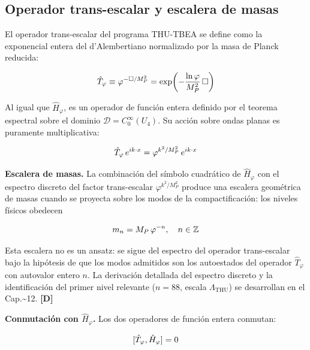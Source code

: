﻿\documentclass[11pt,letterpaper]{article}
\begin{document}
\subsection{Operador trans-escalar y escalera de masas}
El operador trans-escalar del programa THU-TBEA se define como la exponencial entera del d'Alembertiano normalizado por la masa de Planck reducida:

\begin{equation*}
  \resizebox{\ifdim\width>\linewidth \linewidth\else\width\fi}{!}{$\displaystyle \hat{T}_\varphi \equiv \varphi^{-\Box/M_P^2} = \exp\!\left(-\frac{\ln\varphi}{M_P^2}\,\Box\right)$}
\end{equation*}

Al igual que $\hat{H}_\varphi$, es un operador de función entera definido por el teorema espectral sobre el dominio $\mathcal{D} = C_0^\infty(U_4)$. Su acción sobre ondas planas es puramente multiplicativa:

\begin{equation*}
  \resizebox{\ifdim\width>\linewidth \linewidth\else\width\fi}{!}{$\displaystyle \hat{T}_\varphi\, e^{ik\cdot x} = \varphi^{k^2/M_P^2}\, e^{ik\cdot x}$}
\end{equation*}

\textbf{Escalera de masas.} La combinación del símbolo cuadrático de $\hat{H}_\varphi$ con el espectro discreto del factor trans-escalar $\varphi^{k^2/M_P^2}$ produce una escalera geométrica de masas cuando se proyecta sobre los modos de la compactificación: los niveles físicos obedecen

\begin{equation*}
  \resizebox{\ifdim\width>\linewidth \linewidth\else\width\fi}{!}{$\displaystyle m_n = M_P\,\varphi^{-n}, \quad n \in \mathbb{Z}$}
\end{equation*}

Esta escalera no es un ansatz: se sigue del espectro del operador trans-escalar bajo la hipótesis de que los modos admitidos son los autoestados del operador $\hat{T}_\varphi$ con autovalor entero $n$. La derivación detallada del espectro discreto y la identificación del primer nivel relevante ($n = 88$, escala $\Lambda_{\mathrm{THU}}$) se desarrollan en el Cap.\textasciitilde{}12. \textbf{[D]}

\textbf{Conmutación con $\hat{H}_\varphi$.} Los dos operadores de función entera conmutan:

\begin{equation*}
  \resizebox{\ifdim\width>\linewidth \linewidth\else\width\fi}{!}{$\displaystyle [\hat{T}_\varphi, \hat{H}_\varphi] = 0$}
\end{equation*}
\end{document}

